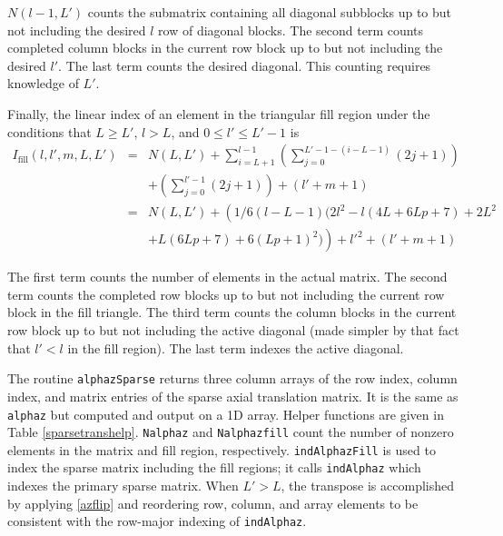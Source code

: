 $N(l-1,L')$ counts the submatrix containing all diagonal subblocks up to but not including the desired $l$ row of diagonal blocks. The second term counts completed column blocks in the current row block up to but not including the desired $l'$. The last term counts the desired diagonal. This counting requires knowledge of $L'$.

Finally, the linear index of an element in the triangular fill region under the conditions that $L \ge L'$, $l > L$, and $0 \le l' \le L'-1$ is
\begin{eqnarray}
I_{\textrm{fill}}(l,l',m,L,L') &=& N(L,L') + \sum_{i= L+1}^{l-1} \left(\sum_{j=0}^{L'-1-(i-L-1)}(2j+1)\right) \nonumber \\
\ & \ & + \left(\sum_{j=0}^{l'-1} (2j + 1)\right) + (l' + m + 1)  \label{eq:a4} \\
\ & =& N(L,L') + \left( 1/6(l-L-1)(2l^2-l(4L+6Lp+7)+2L^2\right. \nonumber \\
\ & \ & \left. +L(6Lp+7)+6(Lp+1)^2)\right) + l'^2 + (l' + m + 1) 
\end{eqnarray}

The first term counts the number of elements in the actual matrix.  The second term counts the completed row blocks up to but not including the current row block in the fill triangle.  The third term counts the column blocks in the current row block up to but not including the active diagonal (made simpler by that fact that $l' < l$ in the fill region).  The last term indexes the active diagonal.  



The routine \texttt{alphazSparse} returns three column arrays of the row index, column index, and matrix entries of the sparse axial translation matrix.  It is the same as \texttt{alphaz} but computed and output on a 1D array. Helper functions are given in Table \ref{sparsetranshelp}. \texttt{Nalphaz} and \texttt{Nalphazfill} count the number of nonzero elements in the matrix and fill region, respectively. \texttt{indAlphazFill} is used to index the sparse matrix including the fill regions; it calls \texttt{indAlphaz} which indexes the primary sparse matrix.  When $L' > L$, the transpose is accomplished by applying \eqref{azflip} and reordering row, column, and array elements to be consistent with the row-major indexing of \texttt{indAlphaz}.  


